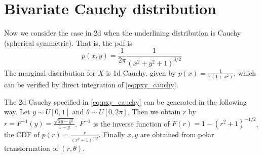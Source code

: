 \documentclass{article}
\begin{document}
\section{Bivariate Cauchy distribution}
Now we consider the case in 2d when the underlining
distribution is Cauchy (spherical symmetric). That is, the pdf is
\begin{equation}\label{eq:pxy_cauchy}
    p(x,y) = \frac{1}{2\pi} \frac{1}{(x^2+y^2+1)^{3/2}}
\end{equation}
The marginal distribution for $X$ is 1d Cauchy,
given by $p(x)=\frac{1}{\pi(1+x^2)}$, which
can be verified by direct integration of
\eqref{eq:pxy_cauchy}.

The 2d Cauchy specified in
\eqref{eq:pxy_cauchy} can be generated in the following way.
Let $y \sim U[0,1]$ and $\theta \sim
U[0, 2\pi]$. Then we obtain $r$
by $r=F^{-1}(y) = \frac{\sqrt{2y-y^2}}{1-y}$.
$F^{-1}$ is the inverse function
of $F(r)=1-(r^2+1)^{-1/2}$, the CDF of
$p(r)= \frac{r}{(r^2+1)^{3/2}}$.
Finally $x,y$ are obtained from polar transformation
of $(r,\theta)$.
\end{document}
